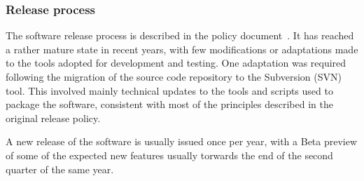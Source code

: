 
\subsubsection{Release process}
The software release process is described in the \Gfour{} policy
document~\cite{release:policy}.  It has reached a rather mature state in recent
years, with few modifications or adaptations made to the tools adopted for 
development and testing.  One adaptation was required following the migration of
the source code repository to the Subversion (SVN)~\cite{release:SVN} tool.  
This involved mainly technical updates to the tools and scripts used to package
the software, consistent with most of the principles described in the original
release policy.

A new release of the \Gfour{} software is usually issued once per year, with a
Beta preview of some of the expected new features usually torwards the end
of the second quarter of the same year.

